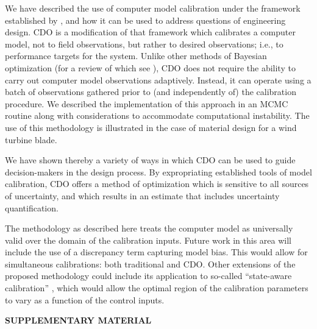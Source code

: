 \documentclass[12pt]{article}
\begin{document}
We have described the 
use of computer model calibration under the framework established by \cite{Kennedy2001}, and how it can be used to address questions of engineering design. 
%
CDO is a modification of that framework which calibrates a computer model, not to field observations, but rather to desired observations; i.e., to performance targets for the system. 
%
Unlike other methods of Bayesian optimization (for a review of which see \citealt{Shahriari2016}), CDO does not require the ability to carry out computer model observations adaptively.
%
Instead, it can operate using a batch of observations gathered prior to (and independently of) the calibration procedure.
%
We described the implementation of this approach in an MCMC routine along with considerations to accommodate computational instability.
%
The use of this methodology is illustrated in the case of material design for a wind turbine blade. 

We have shown thereby a variety of ways in which CDO can be used to guide decision-makers in the design process. 
%
By expropriating established tools of model calibration, CDO offers a method of optimization which is sensitive to all sources of uncertainty, and which results in an estimate that includes uncertainty quantification.

The methodology as described here treats the computer model as universally valid over the domain of the calibration inputs. 
%
Future work in this area will include the use of a discrepancy term capturing model bias.
%
This would allow for simultaneous calibrations: both traditional and CDO.
%
%
Other extensions of the proposed methodology could include its application to so-called ``state-aware calibration'' \citep{Atamturktur2015,Stevens2018,Brown2016}, which would allow the optimal region of the calibration parameters to vary as a function of the control inputs.



\bigskip
\begin{center}
{\large\bf SUPPLEMENTARY MATERIAL}
\end{center}
\end{document}
